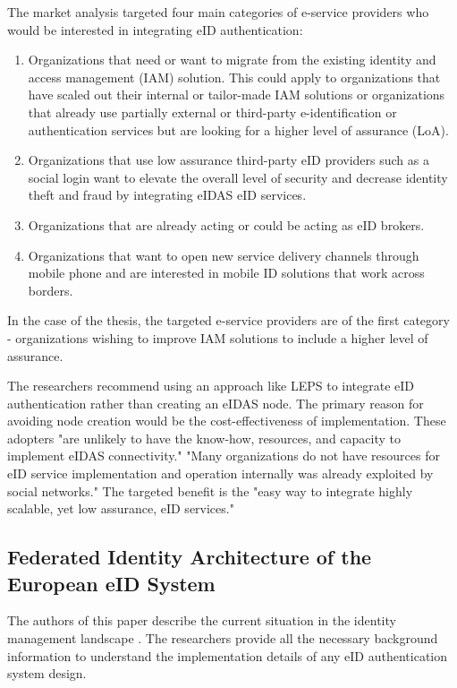 The market analysis targeted four main categories of e-service providers who would be interested in integrating eID authentication:

\begin{enumerate}
    \item Organizations that need or want to migrate from the existing identity and access management (IAM) solution. This could apply to organizations that have scaled out their internal or tailor-made IAM solutions or organizations that already use partially external or third-party e-identification or authentication services but are looking for a higher level of assurance (LoA).
    \item Organizations that use low assurance third-party eID providers such as a social login want to elevate the overall level of security and decrease identity theft and fraud by integrating eIDAS eID services.
    \item Organizations that are already acting or could be acting as eID brokers.
    \item Organizations that want to open new service delivery channels through mobile phone and are interested in mobile ID solutions that work across borders.
\end{enumerate}

In the case of the thesis, the targeted e-service providers are of the first category - organizations wishing to improve IAM solutions to include a higher level of assurance.

The researchers recommend using an approach like LEPS to integrate eID authentication rather than creating an eIDAS node. The primary reason for avoiding node creation would be the cost-effectiveness of implementation. These adopters "are unlikely to have the know-how, resources, and capacity to implement eIDAS connectivity." "Many organizations do not have resources for eID service implementation and operation internally was already exploited by social networks." The targeted benefit is the "easy way to integrate highly scalable, yet low assurance, eID services."

\subsection{Federated Identity Architecture of the European eID System}

The authors of this paper describe the current situation in the identity management landscape \cite{federated-europe-identity}. The researchers provide all the necessary background information to understand the implementation details of any eID authentication system design.


